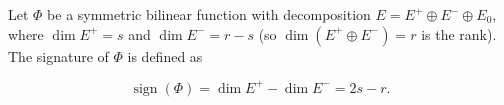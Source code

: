 Let $\Phi$ be a symmetric bilinear function with decomposition $E = E^+ \oplus E^- \oplus E_0$, where $\dim E^+ = s$ and $\dim E^- = r - s$ (so $\dim(E^+ \oplus E^-) = r$ is the rank). The signature of $\Phi$ is defined as

$$\operatorname{sign}(\Phi) = \dim E^+ - \dim E^- = 2s - r.$$
